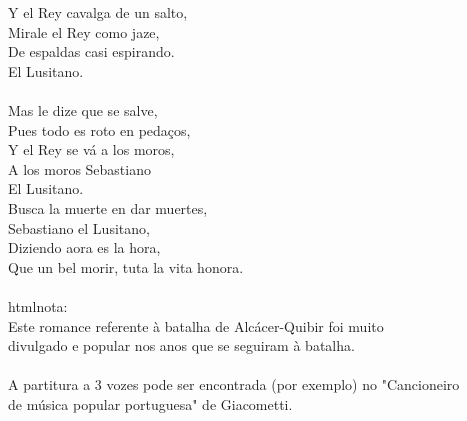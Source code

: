 \documentclass{article}
\begin{document}
Y el Rey cavalga de un salto,\\
Mirale el Rey como jaze,\\
De espaldas casi espirando.\\
El Lusitano.\\
\\
Mas le dize que se salve,\\
Pues todo es roto en pedaços,\\
Y el Rey se vá a los moros,\\
A los moros Sebastiano\\
El Lusitano.\\
Busca la muerte en dar muertes,\\
Sebastiano el Lusitano,\\
Diziendo aora es la hora,\\
Que un bel morir, tuta la vita honora.\\
\\
htmlnota: \\
Este romance referente à batalha de Alcácer-Quibir foi muito \\
divulgado e popular nos anos que se seguiram à batalha.\\
\\
A partitura a 3 vozes pode ser encontrada (por exemplo) no "Cancioneiro\\
de música popular portuguesa" de Giacometti.\\
\end{document}
